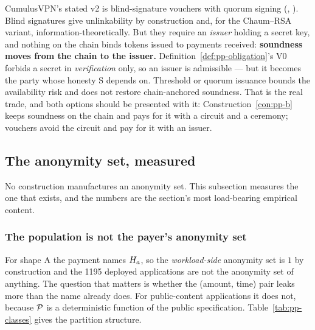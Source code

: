 
\begin{remark}
\label{rem:pp-voucher}
CumulusVPN's stated v2 is blind-signature vouchers with quorum signing (\vision,
). Blind signatures give unlinkability by construction
and, for the Chaum--RSA variant, information-theoretically. But they require an \emph{issuer} holding
a secret key, and nothing on the chain binds tokens issued to payments received: \textbf{soundness
moves from the chain to the issuer.} Definition~\ref{def:pp-obligation}'s V0 forbids a secret in
\emph{verification} only, so an issuer is admissible --- but it becomes the party whose honesty S
depends on. Threshold or quorum issuance bounds the availability risk and does not restore
chain-anchored soundness. That is the real trade, and both options should be presented with it:
Construction~\ref{con:pp-b} keeps soundness on the chain and pays for it with a circuit and a
ceremony; vouchers avoid the circuit and pay for it with an issuer.
\end{remark}

\subsection{The anonymity set, measured}
\label{sec:pp-anonymity}

No construction manufactures an anonymity set. This subsection measures the one that exists, and the
numbers are the section's most load-bearing empirical content.

\subsubsection{The population is not the payer's anonymity set}

For shape A the payment names $H_{a}$, so the \emph{workload-side} anonymity set is $1$ by
construction and the \num{1195} deployed applications are not the anonymity set of anything. The
question that matters is whether the (amount, time) pair leaks more than the name already does. For
public-content applications it does not, because $\mathcal{P}$ is a deterministic function of the public
specification. Table~\ref{tab:pp-classes} gives the partition structure.

